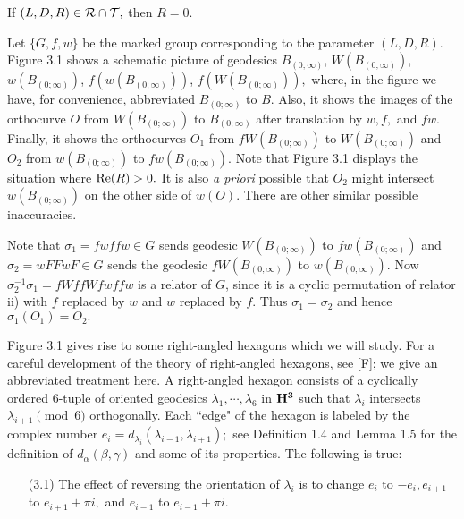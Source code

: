  If $(L,D,R) \in \cal R \cap {\cal T},$ then $R=0$.
\endproclaim

  Let $\{G,f,w\}$ be the marked group corresponding to the parameter $(L, D, R).$
Figure 3.1  shows a schematic picture of geodesics
$B_{(0;\infty)}$, $W(B_{(0;\infty)})$, $w(B_{(0;\infty)})$, $f(w(B_{(0;\infty)}))$, $f(W(B_{(0;\infty)})),$ where, in the figure we have, for convenience, abbreviated $ B_{(0;\infty)}$ to $B$. 
Also, it shows the images of the orthocurve $O$ from
$W(B_{(0;\infty)})$  to $ B_{(0;\infty)}$ after translation by $w, f,$ and $fw.$  
Finally, it shows the
orthocurves  $O_1$ from $fW(B_{(0;\infty)})$ to $W(B_{(0;\infty)})$ 
and $O_2$ from $w(B_{(0;\infty)})$ to $fw(B_{(0;\infty)}).$ Note that
Figure 3.1 displays the situation where ${\rm Re}(R)>0.$  It is also 
{\it a priori}
possible that $O_2$  might intersect $w(B_{(0;\infty)})$ on the other side of $w(O).$
There are other similar  possible inaccuracies.
 

Note that $\sigma_1=fwffw\in G$ sends
geodesic $W(B_{(0;\infty)})$ to $fw(B_{(0;\infty)})$ and $\sigma_2=wFFwF\in G$ sends the
geodesic $fW(B_{(0;\infty)})$ to $w(B_{(0;\infty)})$.  
Now $\sigma_2^{-1}\sigma_1=fWffWfwffw$ is a relator
of $G$, since it is a cyclic permutation of relator ii) with $f$ replaced by $w$
and $w$ replaced by $f.$  Thus $\sigma_1=\sigma_2$ and hence
$\sigma_1(O_1)=O_2.$




Figure 3.1 gives rise to some right-angled hexagons which we will study. 
For a careful development of the theory of right-angled hexagons, see
[F]; we give an abbreviated treatment here.
A right-angled hexagon consists of a cyclically
ordered 6-tuple of oriented geodesics $\lambda_1,\cdots,\lambda_6$
in ${\bf H^3}$ such that $\lambda_i$ intersects $\lambda_{i+1} \pmod 6$ orthogonally.  Each ``edge" of the hexagon is labeled by the
complex number $e_i = d_{\lambda_i}(\lambda_{i-1},\lambda_{i+1});$ 
see Definition 1.4 and Lemma 1.5 for the definition of $d_\alpha(\beta,\gamma)$ and some of its properties.
The following is true:

\begin{itemize}
\item[(3.1)] The effect of reversing the orientation of
$\lambda_i$ is to change $e_i$ to $-e_i, e_{i+1}$ to $e_{i+1} + \pi i,$ and
$e_{i-1}$ to $e_{i-1}+\pi i.$
\end{itemize}

